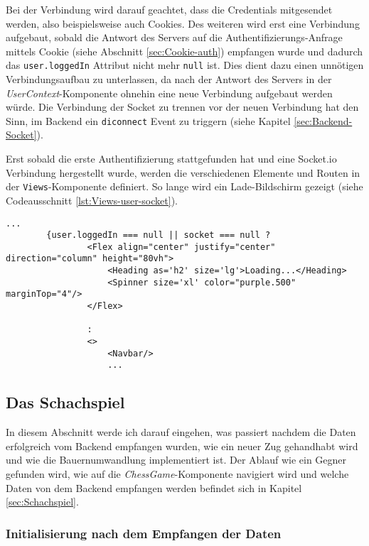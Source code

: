 Bei der Verbindung wird darauf geachtet, dass die Credentials mitgesendet werden, also beispielsweise auch Cookies. Des weiteren wird erst eine Verbindung aufgebaut, sobald die Antwort des Servers auf die Authentifizierungs-Anfrage mittels Cookie (siehe Abschnitt \ref{sec:Cookie-auth}) empfangen wurde und dadurch das \verb|user.loggedIn| Attribut nicht mehr \verb|null| ist. Dies dient dazu einen unnötigen Verbindungsaufbau zu unterlassen, da nach der Antwort des Servers in der \textit{UserContext}-Komponente ohnehin eine neue Verbindung aufgebaut werden würde.
Die Verbindung der Socket zu trennen vor der neuen Verbindung hat den Sinn, im Backend ein \verb|diconnect| Event zu triggern (siehe Kapitel \ref{sec:Backend-Socket}).

Erst sobald die erste Authentifizierung stattgefunden hat und eine Socket.io Verbindung hergestellt wurde, werden die verschiedenen Elemente und Routen in der \verb|Views|-Komponente definiert. So lange wird ein Lade-Bildschirm gezeigt (siehe Codeausschnitt \ref{lst:Views-user-socket}).

\begin{lstlisting}[style=codeStyle, caption={Ausschnitt der \textit{Views}-Komponente}, label={lst:Views-user-socket}]
		   ...
        {user.loggedIn === null || socket === null ?
                <Flex align="center" justify="center" direction="column" height="80vh">
                    <Heading as='h2' size='lg'>Loading...</Heading>
                    <Spinner size='xl' color="purple.500" marginTop="4"/>
                </Flex>

                :
                <>
                    <Navbar/>
                    ...
\end{lstlisting}

\subsection{Das Schachspiel}
In diesem Abschnitt werde ich darauf eingehen, was passiert nachdem die Daten erfolgreich vom Backend empfangen wurden, wie ein neuer Zug gehandhabt wird und wie die Bauernumwandlung implementiert ist.
Der Ablauf wie ein Gegner gefunden wird, wie auf die \textit{ChessGame}-Komponente navigiert wird und welche Daten von dem Backend empfangen werden befindet sich in Kapitel \ref{sec:Schachspiel}.

\subsubsection{Initialisierung nach dem Empfangen der Daten}



